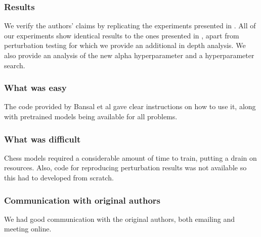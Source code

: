 \subsubsection*{Results}

We verify the authors' claims by replicating the experiments presented in \cite{bansal2022endtoend}. All of our experiments show identical results to the ones presented in \cite{bansal2022endtoend}, apart from perturbation testing for which we provide an additional in depth analysis. We also provide an analysis of the new alpha hyperparameter and a hyperparameter search.

\subsubsection*{What was easy}

The code provided by Bansal et al gave clear instructions on how to use it, along with pretrained models being available for all problems.

\subsubsection*{What was difficult}

Chess models required a considerable amount of time to train, putting a drain on resources. Also, code for reproducing perturbation results was not available so this had to developed from scratch.

\subsubsection*{Communication with original authors}

We had good communication with the original authors, both emailing and meeting online.